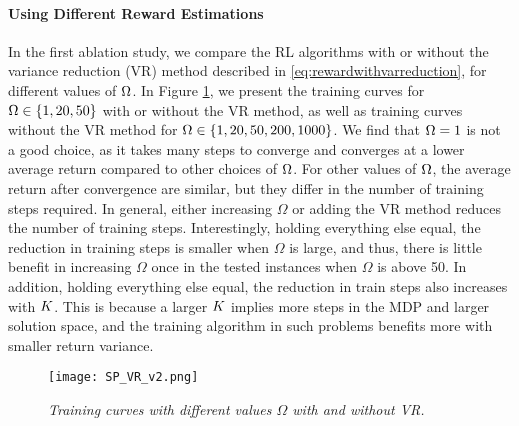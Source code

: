 \documentclass{article} %
\begin{document}

\paragraph{Using Different Reward Estimations}
In the first ablation study, we compare the RL algorithms with or without the variance reduction (VR) method described in \eqref{eq:rewardwithvarreduction}, for different values of $\Omega$.
In Figure \ref{fig:trainingcurve}, we present the training curves for $\Omega \in \{1,20, 50\}$ with or without the VR method, as well as training curves without the VR method for $\Omega \in \{1,20, 50, 200, 1000\}$. We find that $\Omega=1$ is not a good choice, as it takes many steps to converge and converges at a lower average return compared to other choices of $\Omega$. For other values of $\Omega$, the average return after convergence are similar, but they differ in the number of training steps required. In general, either increasing $\Omega$ or adding the VR method reduces the number of training steps. Interestingly, holding everything else equal, the reduction in training steps is smaller when $\Omega$ is large, and thus, there is little benefit in increasing $\Omega$ once in the tested instances when $\Omega$ is above 50. In addition, holding everything else equal, the reduction in train steps also increases with $K$. This is because a larger $K$ implies more steps in the MDP and larger solution space, and the training algorithm in such problems benefits more with smaller return variance.


\begin{figure}[htp]
\centering
  \texttt{[image: SP\_VR\_v2.png]}
\caption{\textit{Training curves with different values $\Omega$ with and without VR.} \label{fig:trainingcurve}}
\end{figure}

\end{document}

